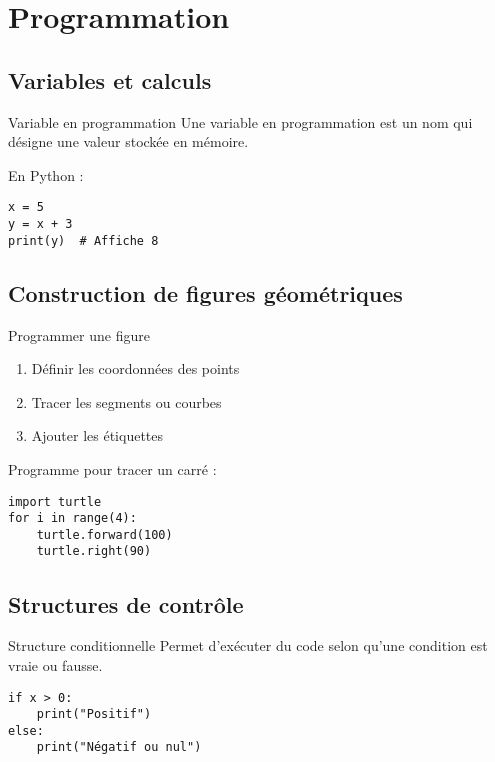 \chapter{Programmation}

\section{Variables et calculs}
\begin{definition}{Variable en programmation}
Une variable en programmation est un nom qui désigne une valeur stockée en mémoire.
\end{definition}

\begin{exemple}
En Python :
\begin{verbatim}
x = 5
y = x + 3
print(y)  # Affiche 8
\end{verbatim}
\end{exemple}

\section{Construction de figures géométriques}
\begin{methode}{Programmer une figure}
\begin{enumerate}
    \item Définir les coordonnées des points
    \item Tracer les segments ou courbes
    \item Ajouter les étiquettes
\end{enumerate}
\end{methode}

\begin{exemple}
Programme pour tracer un carré :
\begin{verbatim}
import turtle
for i in range(4):
    turtle.forward(100)
    turtle.right(90)
\end{verbatim}
\end{exemple}

\section{Structures de contrôle}
\begin{definition}{Structure conditionnelle}
Permet d'exécuter du code selon qu'une condition est vraie ou fausse.
\end{definition}

\begin{exemple}
\begin{verbatim}
if x > 0:
    print("Positif")
else:
    print("Négatif ou nul")
\end{verbatim}
\end{exemple} 